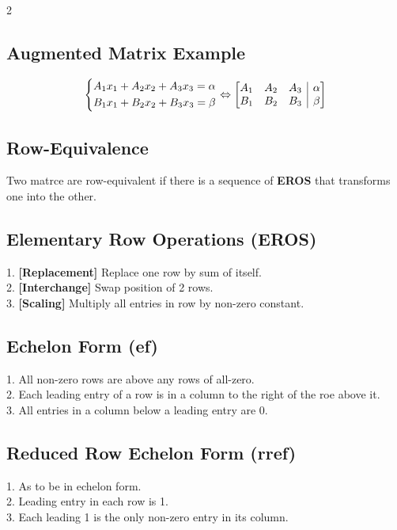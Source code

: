 \documentclass[5pt]{article}
\makeatletter
\newenvironment{amatrix}[1]{%
  \left[\begin{array}{@{}*{#1}{c}|c@{}}
}{%
  \end{array}\right]
}
\makeatother
\begin{document}
\begin{multicols}{2}
\subsection{Augmented Matrix Example}
\begin{equation}
\left\{\begin{split}
A_1x_1+A_2x_2+A_3x_3=\alpha \\
B_1x_1+B_2x_2+B_3x_3=\beta \\
\end{split}\right.
\Leftrightarrow
\begin{amatrix}{3}
    A_1 & A_2 & A_3 & \alpha \\
    B_1 & B_2 & B_3 & \beta \\
 \end{amatrix}
\end{equation}


\subsection{Row-Equivalence}
Two matrce are row-equivalent if there is a sequence of \textbf{EROS} that transforms one into the other.


\subsection{Elementary Row Operations (EROS)}
1. \textbf{[Replacement]} Replace one row by sum of itself. \\
2. \textbf{[Interchange]} Swap position of 2 rows. \\
3. \textbf{[Scaling]} Multiply all entries in row by non-zero constant. \\


\subsection{Echelon Form (ef)}
1. All non-zero rows are above any rows of all-zero. \\
2. Each leading entry of a row is in a column to the right of the roe above it. \\
3. All entries in a column below a leading entry are 0. \\


\subsection{Reduced Row Echelon Form (rref)}
1. As to be in echelon form. \\
2. Leading entry in each row is 1. \\
3. Each leading 1 is the only non-zero entry in its column. \\



\end{multicols}
\end{document}
